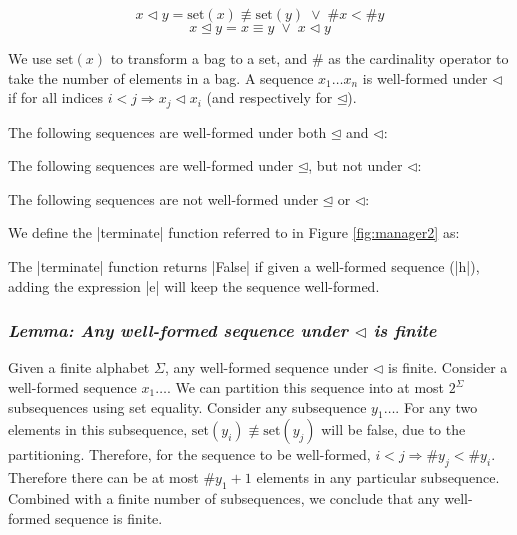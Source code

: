 \documentclass[draft]{sigplanconf}
\newcommand{\lemma}[1]{\subsubsection*{\textit{Lemma: #1}}}
\newcommand{\set}{\mathrm{set}}
\newcommand{\veeskip}{\;\vee\;}
\begin{document}
\[
x \lhd y = \set(x) \not\equiv \set(y)  \veeskip \# x < \# y
\]
\[
x \unlhd y = x \equiv y \veeskip x \lhd y
\]

We use $\set(x)$ to transform a bag to a set, and $\#$ as the cardinality operator to take the number of elements in a bag. A sequence $x_1 \ldots x_n$ is well-formed under $\lhd$ if for all indices $i < j \Rightarrow x_j \lhd x_i$ (and respectively for $\unlhd$).

The following sequences are well-formed under both $\unlhd$ and $\lhd$:

\begin{code}
\end{code}

The following sequences are well-formed under $\unlhd$, but not under $\lhd$:

\begin{code}
\end{code}

The following sequences are not well-formed under $\unlhd$ or $\lhd$:

\begin{code}
\end{code}

We define the |terminate| function referred to in Figure \ref{fig:manager2} as:


The |terminate| function returns |False| if given a well-formed sequence (|h|), adding the expression |e| will keep the sequence well-formed.

\lemma{Any well-formed sequence under $\lhd$ is finite}

Given a finite alphabet $\Sigma$, any well-formed sequence under $\lhd$ is finite. Consider a well-formed sequence $x_1\ldots$. We can partition this sequence into at most $2^\Sigma$ subsequences using set equality. Consider any subsequence $y_1\ldots$. For any two elements in this subsequence, $\set(y_i) \not\equiv \set(y_j)$ will be false, due to the partitioning. Therefore, for the sequence to be well-formed, $i < j \Rightarrow \# y_j < \# y_i$. Therefore there can be at most $\#y_1+1$ elements in any particular subsequence. Combined with a finite number of subsequences, we conclude that any well-formed sequence is finite.
\end{document}
